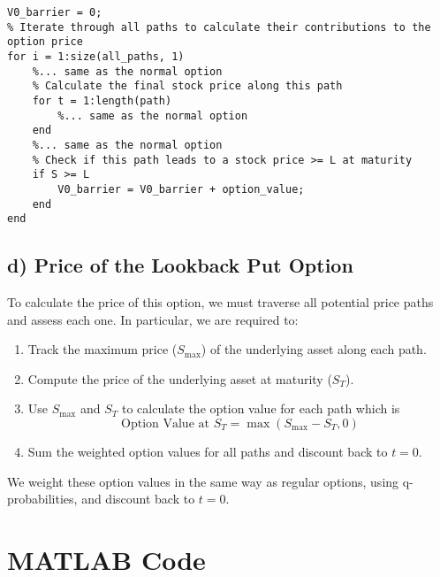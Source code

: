 \documentclass[12pt]{article}
\begin{document}
\textbf{}

\begin{lstlisting}[label=lst:bcode,
    caption=Add one if statement to check if the stock price \( S_T \) at the end of each path is greater than or equal to \( L \).,
    float]
V0_barrier = 0;
% Iterate through all paths to calculate their contributions to the option price
for i = 1:size(all_paths, 1)
    %... same as the normal option
    % Calculate the final stock price along this path
    for t = 1:length(path)
        %... same as the normal option
    end
    %... same as the normal option
    % Check if this path leads to a stock price >= L at maturity
    if S >= L
        V0_barrier = V0_barrier + option_value;
    end
end
\end{lstlisting}

\subsection{d) Price of the Lookback Put Option}

To calculate the price of this option, we must traverse all potential price
paths and assess each one. In particular, we are required to:

\begin{enumerate}
    \item Track the maximum price (\( S_{\max} \)) of the underlying asset
          along each path.
    \item Compute the price of the underlying asset at maturity (\( S_T
          \)).
    \item Use \( S_{\max} \) and \( S_T \) to calculate the option value
          for each path which is \[ \text{Option Value at } S_T = \max(S_{\max}
              - S_T, 0)\]
    \item Sum the weighted option values for all paths and discount back to
          \( t = 0 \).
\end{enumerate}

We weight these option values in the same way as regular options, using
q-probabilities, and discount back to \( t=0 \). \textbf{}

\appendix

\section{MATLAB Code}
\label{apx:code}
\end{document}
